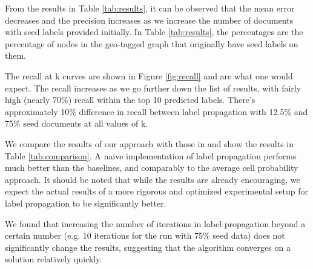 From the results in Table \ref{tab:results}, it can be observed that the mean
error decreases and the precision increases as we increase the number of
documents with seed labels provided initially. In Table \ref{tab:results}, the
percentages are the percentage of nodes in the geo-tagged graph that
originally have seed labels on them.

The recall at k curves are shown in Figure \ref{fig:recall} and are what one
would expect. The recall increases as we go further down the list of results,
with fairly high (nearly 70\%) recall within the top 10 predicted labels.
There's approximately 10\% difference in recall between label propagation with
12.5\% and 75\% seed documents at all values of k.

We compare the results of our approach with those in \cite{wing-baldridge:11}
and show the results in Table \ref{tab:comparison}. A naive implementation of
label propagation performs much better than the baselines, and comparably to
the average cell probability approach. It should be noted that while the
results are already encouraging, we expect the actual results of a more
rigorous and optimized experimental setup for label propagation to be
significantly better.

We found that increasing the number of iterations in label propagation beyond
a certain number (e.g. 10 iterations for the run with 75\% seed data) does not
significantly change the results, suggesting that the algorithm converges on a
solution relatively quickly.
